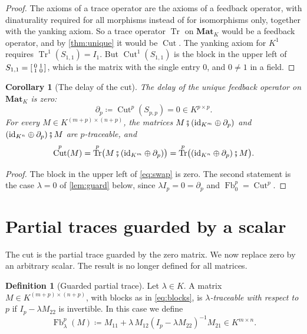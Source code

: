 \documentclass[11pt,a4paper]{article}
\theoremstyle{plain}
\newtheorem{corollary}[theorem]{Corollary}
\theoremstyle{definition}
\newtheorem{definition}[theorem]{Definition}
\theoremstyle{remark}
\DeclareMathOperator{\Fb}{Fb}
\DeclareMathOperator{\Tr}{Tr}
\DeclareMathOperator{\Cut}{Cut}
\newcommand{\id}{\mathrm{id}}
\newcommand{\then}{\mathbin{\fatsemi}}
\newcommand{\Mat}{\mathbf{Mat}}
\begin{document}
\begin{proof}
    The axioms of a trace operator are the axioms of a feedback operator, with dinaturality required for all morphisms instead of for isomorphisms only, together with the yanking axiom.
    So a trace operator $\Tr$ on $\Mat_K$ would be a feedback operator, and by \cref{thm:unique} it would be $\Cut$.
    The yanking axiom for $K^1$ requires $\Tr^1(S_{1,1}) = I_1$.
    But $\Cut^1(S_{1,1})$ is the block in the upper left of $S_{1,1} = \begin{bsmallmatrix} 0 & 1 \\ 1 & 0 \end{bsmallmatrix}$, which is the matrix with the single entry $0$, and $0 \neq 1$ in a field.
\end{proof}

\begin{corollary}[The delay of the cut]
    \label{cor:cut-delay}
    The delay of the unique feedback operator on $\Mat_K$ is zero:
    \begin{equation}
        \partial_p \coloneqq \Cut^p(S_{p,p}) = 0 \in K^{p \times p} .
    \end{equation}
    For every $M \in K^{(m+p) \times (n+p)}$, the matrices $M \then (\id_{K^m} \oplus \partial_p)$ and $(\id_{K^n} \oplus \partial_p) \then M$ are $p$-traceable, and
    \begin{equation}
        \Cut^p(M) = \Tr^p\bigl( M \then (\id_{K^m} \oplus \partial_p) \bigr) = \Tr^p\bigl( (\id_{K^n} \oplus \partial_p) \then M \bigr) .
    \end{equation}
\end{corollary}

\begin{proof}
    The block in the upper left of \cref{eq:swap} is zero.
    The second statement is the case $\lambda = 0$ of \cref{lem:guard} below, since $\lambda I_p = 0 = \partial_p$ and $\Fb_0^p = \Cut^p$.
\end{proof}

\section{Partial traces guarded by a scalar}
\label{sec:guarded}

The cut is the partial trace guarded by the zero matrix.
We now replace zero by an arbitrary scalar.
The result is no longer defined for all matrices.

\begin{definition}[Guarded partial trace]
    \label{def:guarded}
    Let $\lambda \in K$.
    A matrix $M \in K^{(m+p) \times (n+p)}$, with blocks as in \cref{eq:blocks}, is \emph{$\lambda$-traceable with respect to $p$} if $I_p - \lambda M_{22}$ is invertible.
    In this case we define
    \begin{equation}
        \label{eq:guarded}
        \Fb_\lambda^p(M) \coloneqq M_{11} + \lambda\, M_{12} (I_p - \lambda M_{22})^{-1} M_{21} \in K^{m \times n} .
    \end{equation}
\end{definition}
\end{document}
